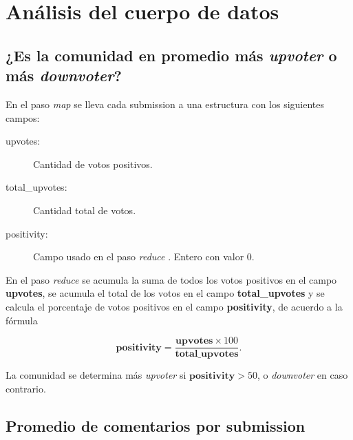 \documentclass[a4paper,10pt,twoside]{article}
\begin{document}
\newpage




\tableofcontents

\newpage




\section{Análisis del cuerpo de datos}

\newcommand{\map}{\emph{map} }
\newcommand{\reduce}{\emph{reduce} }


\subsection{¿Es la comunidad en promedio más \emph{upvoter} o más \emph{downvoter}?}

En el paso \map se lleva cada submission a una estructura con los siguientes campos:

\begin{description}
	\item[upvotes:] Cantidad de votos positivos.
	\item[total\_upvotes:] Cantidad total de votos.
	\item[positivity:] Campo usado en el paso \reduce. Entero con valor 0.
\end{description}

En el paso \reduce se acumula la suma de todos los votos positivos en el campo \textbf{upvotes}, se acumula el total de los votos en el campo \textbf{total\_upvotes} y se calcula el porcentaje de votos positivos en el campo \textbf{positivity}, de acuerdo a la fórmula

$$\textbf{positivity} = \frac{\textbf{upvotes} \times 100}{\textbf{total\_upvotes}}.$$

La comunidad se determina más \emph{upvoter} si $\textbf{positivity} > 50$, o \emph{downvoter} en caso contrario.


\subsection{Promedio de comentarios por submission}
\end{document}
